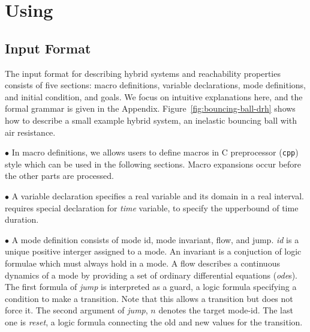 \section{Using \dReach{}}\label{sec:using-dreach}
\subsection{Input Format}\label{sec:input-format}
The input format for describing hybrid systems and reachability properties consists of five
sections: macro definitions, variable declarations, mode definitions,
and initial condition, and goals. We focus on intuitive explanations here, and the formal grammar is
given in the Appendix. Figure~\ref{fig:bouncing-ball-drh} shows how to describe a small
example hybrid system, an inelastic bouncing ball with air resistance. 

$\bullet$
In macro definitions, we allows users to define macros in C
preprocessor (\texttt{cpp}) style which can be used in the following
sections. Macro expansions occur before the other parts are processed.

$\bullet$
        A variable declaration specifies a real variable and its domain in a real interval. 
	\dReach{} requires special declaration for \textit{time} variable, to specify the
	upperbound of time duration.

$\bullet$ A mode definition consists of mode id, mode invariant, flow, and jump.
\textit{id} is a unique positive interger assigned to a mode. An
invariant is a conjuction of logic formulae which must always hold in
a mode. A flow describes a continuous dynamics of a mode by providing
a set of ordinary differential equations (\textit{ode}s). The first
formula of \textit{jump} is interpreted as a guard, a logic formula
specifying a condition to make a transition. Note that this allows a
transition but does not force it. The second argument of
\textit{jump}, $n$ denotes the target mode-id. The last one is
\textit{reset}, a logic formula connecting the old and new values for
the transition.

